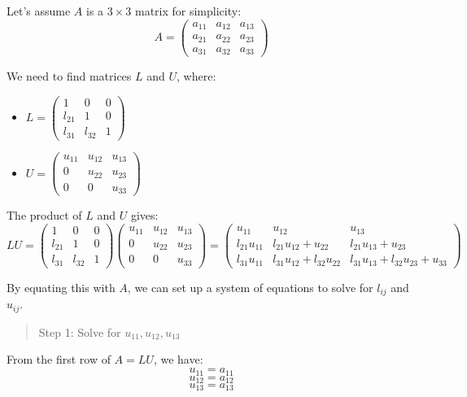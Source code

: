\documentclass[
  letterpaper,
  DIV=11,
  numbers=noendperiod]{scrreprt}
\theoremstyle{plain}
\theoremstyle{definition}
\theoremstyle{remark}
\begin{document}
Let's assume \(A\) is a \(3 \times 3\) matrix for simplicity:
\[A = \begin{pmatrix}a_{11} & a_{12} & a_{13} \\a_{21} & a_{22} & a_{23} \\a_{31} & a_{32} & a_{33}\end{pmatrix}\]

We need to find matrices \(L\) and \(U\), where:

\begin{itemize}
\item
  \(L = \begin{pmatrix}
  1 & 0 & 0 \\
  l_{21} & 1 & 0 \\
  l_{31} & l_{32} & 1
  \end{pmatrix}\)
\item
  \(U = \begin{pmatrix}
  u_{11} & u_{12} & u_{13} \\
  0 & u_{22} & u_{23} \\
  0 & 0 & u_{33}
  \end{pmatrix}\)
\end{itemize}

The product of \(L\) and \(U\) gives:
\[LU = \begin{pmatrix} 1 & 0 & 0 \\l_{21} & 1 & 0 \\l_{31} & l_{32} & 1\end{pmatrix}\begin{pmatrix} u_{11} & u_{12} & u_{13} \\0 & u_{22} & u_{23} \\0 & 0 & u_{33}\end{pmatrix}=\begin{pmatrix} u_{11} & u_{12} & u_{13} \\l_{21}u_{11} & l_{21}u_{12} + u_{22} & l_{21}u_{13} + u_{23} \\l_{31}u_{11} & l_{31}u_{12} + l_{32}u_{22} & l_{31}u_{13} + l_{32}u_{23} + u_{33}\end{pmatrix}\]

By equating this with \(A\), we can set up a system of equations to
solve for \(l_{ij}\) and \(u_{ij}\).

\begin{quote}
Step 1: Solve for \(u_{11}, u_{12}, u_{13}\)
\end{quote}

From the first row of \(A = LU\), we have: \[u_{11} = a_{11}\]
\[u_{12} = a_{12}\] \[u_{13} = a_{13}\]
\end{document}
